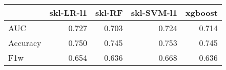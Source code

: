 \begin{tabular}{lrrrr}
\toprule
{} &  skl-LR-l1 &  skl-RF &  skl-SVM-l1 &  xgboost \\
\midrule
AUC      &      0.727 &   0.703 &       0.724 &    0.714 \\
Accuracy &      0.750 &   0.745 &       0.753 &    0.745 \\
F1w      &      0.654 &   0.636 &       0.668 &    0.636 \\
\bottomrule
\end{tabular}
